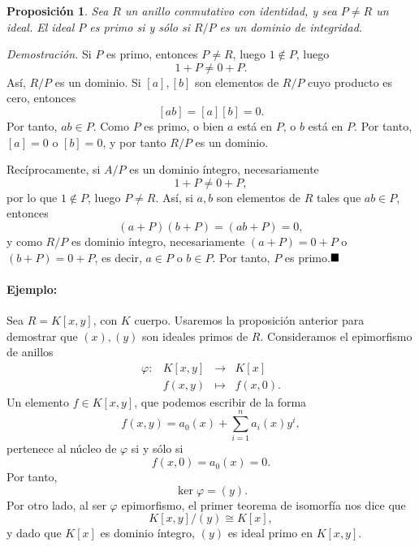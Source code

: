 \documentclass[11pt]{book}
\def\qed{\hfill\blacksquare}
\newtheorem{prop}[theorem]{Proposición}
\theoremstyle{definition}
\begin{document}
\begin{prop}
    Sea $R$ un anillo conmutativo con identidad, y sea $P\neq R$ un ideal. El ideal $P$ es primo si y sólo si $R/P$ es un dominio de integridad.
\end{prop}
\noindent\textit{Demostración.} Si $P$ es primo, entonces $P\neq R$, luego $1\notin P$, luego\[
1+P\neq 0+ P.
\]Así, $R/P$ es un dominio. Si $[a],[b]$ son elementos de $R/P$ cuyo producto es cero, entonces\[
[ab]=[a][b]=0.
\]Por tanto, $ab\in P$. Como $P$ es primo, o bien $a$ está en $P$, o $b$ está en $P$. Por tanto, $[a]=0$ o $[b]=0$, y por tanto $R/P$ es un dominio.

Recíprocamente, si $A/P$ es un dominio íntegro, necesariamente\[
1+P\neq 0+ P,
\]por lo que $1\notin P$, luego $P\neq R$. Así, si $a,b$ son elementos de $R$ tales que $ab\in P$, entonces\[
(a+P)(b+P)=(ab+P)=0,
\]y como $R/P$ es dominio íntegro, necesariamente $(a+P)=0+P$ o $(b+P)=0+P$, es decir, $a\in P$ o $b\in P$. Por tanto, $P$ es primo.$\qed$

\paragraph{Ejemplo:} Sea $R=K[x,y]$, con $K$ cuerpo. Usaremos la proposición anterior para demostrar que $(x),(y)$ son ideales primos de $R$. Consideramos el epimorfismo de anillos\[
\begin{array}{rlcl}
    \varphi:&K[x,y]&\longrightarrow &K[x]\\
    &f(x,y)&\longmapsto &f(x,0).
\end{array}
\]Un elemento $f\in K[x,y]$, que podemos escribir de la forma\[
f(x,y)=a_0(x)+\sum_{i=1}^n a_i(x)y^i,
\]pertenece al núcleo de $\varphi$ si y sólo si\[
f(x,0)=a_0(x)=0.
\]Por tanto,\[
\ker\varphi = (y).
\]Por otro lado, al ser $\varphi$ epimorfismo, el primer teorema de isomorfía nos dice que\[
K[x,y]/(y)\cong K[x],
\]y dado que $K[x]$ es dominio íntegro, $(y)$ es ideal primo en $K[x,y]$.
\end{document}

